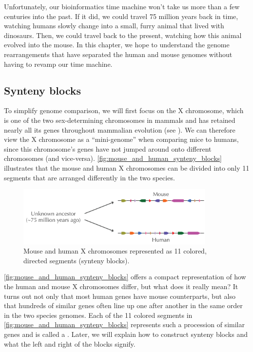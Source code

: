 Unfortunately, our bioinformatics time machine won't take us more than a few centuries into the past.  If it did, we could travel 75 million years back in time, watching humans slowly change into a small, furry animal that lived with dinosaurs.  Then, we could travel back to the present, watching how this animal evolved into the mouse. In this chapter, we hope to understand the genome rearrangements that have separated the human and mouse genomes without having to revamp our time machine.

\subsection{Synteny blocks}
\label{subsec:synteny_blocks}

To simplify genome comparison, we will first focus on the X chromosome, which is one of the two sex-determining chromosomes in mammals and has retained nearly all its genes throughout mammalian evolution (see ). We can therefore view the X chromosome as a ``mini-genome'' when comparing mice to humans, since this chromosome's genes have not jumped around onto different chromosomes (and vice-versa). \autoref{fig:mouse_and_human_synteny_blocks} illustrates that the mouse and human X chromosomes can be divided into only 11 segments that are arranged differently in the two species.\\

\begin{figure}[h]
\mySfFamily
\centering
\includegraphics[width=0.88\textwidth]{images/rearrangements/mouse_and_human_synteny_blocks}
\caption{Mouse and human X chromosomes represented as 11 colored, directed segments (synteny blocks).}
\label{fig:mouse_and_human_synteny_blocks}
\end{figure}

\autoref{fig:mouse_and_human_synteny_blocks} offers a compact representation of how the human and mouse X chromosomes differ, but what does it really mean?  It turns out not only that most human genes have mouse counterparts, but also that hundreds of similar genes often line up one after another in the same order in the two species genomes. Each of the 11 colored segments in \autoref{fig:mouse_and_human_synteny_blocks} represents such a procession of similar genes and is called a . Later, we will explain how to construct synteny blocks and what the left and right  of the blocks signify.

